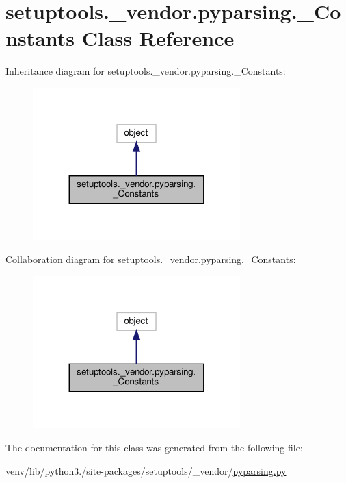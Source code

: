 \hypertarget{classsetuptools_1_1__vendor_1_1pyparsing_1_1__Constants}{}\section{setuptools.\+\_\+vendor.\+pyparsing.\+\_\+\+Constants Class Reference}
\label{classsetuptools_1_1__vendor_1_1pyparsing_1_1__Constants}


Inheritance diagram for setuptools.\+\_\+vendor.\+pyparsing.\+\_\+\+Constants\+:
\nopagebreak
\begin{figure}[H]
\begin{center}
\leavevmode
\includegraphics[width=227pt]{classsetuptools_1_1__vendor_1_1pyparsing_1_1__Constants__inherit__graph}
\end{center}
\end{figure}


Collaboration diagram for setuptools.\+\_\+vendor.\+pyparsing.\+\_\+\+Constants\+:
\nopagebreak
\begin{figure}[H]
\begin{center}
\leavevmode
\includegraphics[width=227pt]{classsetuptools_1_1__vendor_1_1pyparsing_1_1__Constants__coll__graph}
\end{center}
\end{figure}


The documentation for this class was generated from the following file\+:\begin{DoxyCompactItemize}
\item 
venv/lib/python3./site-\/packages/setuptools/\+\_\+vendor/\hyperlink{setuptools_2__vendor_2pyparsing_8py}{pyparsing.\+py}\end{DoxyCompactItemize}
